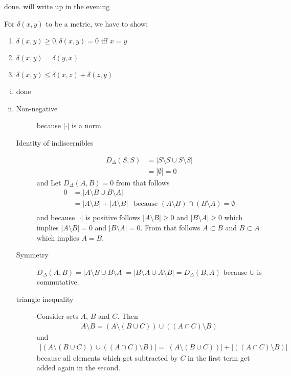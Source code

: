 \documentclass[10pt,a4paper,boxed]{hmcpset}
\begin{document}
		\begin{problem}[4. Distances]
		\end{problem}
		\begin{solution}
			done. will write up in the evening
	
			For $\delta(x,y)$ to be a metric, we have to show:
			\begin{enumerate}
				\item $\delta(x,y)\geq 0, \delta(x,y)=0 \mbox{ iff } x=y$
				\item $\delta(x,y)=\delta(y,x)$
				\item $\delta(x,y) \leq \delta(x,z)+\delta(z,y)$
			\end{enumerate}
	
			\begin{enumerate}[(i)]
				\item done
				\item 
					\begin{description}
						\item[Non-negative] because $|\cdot|$ is a norm.
						\item[Identity of indiscernibles] 
							\begin{align}
								D_\Delta(S,S) &= |S\setminus S \cup S\setminus S| \\
															&= | \emptyset	| = 0
							\end{align}
							and
							Let $D_\Delta(A,B) = 0$ from that follows
							\begin{align}
								 0 &= |A\setminus B \cup B \setminus A| \\
								 &= | A \setminus B| + | A \setminus B| & \text{because } (A \setminus B) \cap (B \setminus A) = \emptyset \label{leererschnitt} \\
							\end{align}
							and because $| \cdot |$ is positive follows $|A \setminus B| \geq 0$ and $|B\setminus A| \geq 0$ which implies
							$|A \setminus B| = 0$ and $|B\setminus A| = 0$. From that follows $A \subset B$ and $B \subset A$ which implies $A=B$.
						\item[Symmetry] $D_\Delta(A,B) = |A \setminus B \cup B \setminus A| = | B \setminus A \cup A \setminus B| = D_\Delta(B,A)$ because $\cup$ is commutative.
						\item[triangle inequality]
							Consider sets $A$, $B$ and $C$. Then
							\begin{align}
								A \setminus B = (A \setminus(B \cup C) )\cup ((A \cap C) \setminus B) \label{umformung}
							\end{align}
							and
							\begin{align}
								|(A \setminus(B \cup C) )\cup ((A \cap C) \setminus B)| = |(A \setminus(B \cup C) )| + | ((A \cap C) \setminus B)|  \label{gleichegroesze}
							\end{align}
							because all elements which get subtracted by $C$ in the first term get added again in the second.	


\end{description}
\end{enumerate}
\end{solution}
\end{document}
